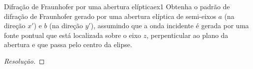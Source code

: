 \begin{exercício}{Difração de Fraunhofer por uma abertura elíptica}{ex1}
    Obtenha o padrão de difração de Fraunhofer gerado por uma abertura elíptica de semi-eixos \(a\) (na direção \(x'\)) e \(b\) (na direção \(y'\)), assumindo que a onda incidente é gerada por uma fonte pontual que está localizada sobre o eixo \(z\), perpenticular ao plano da abertura e que passa pelo centro da elipse.
\end{exercício}
\begin{proof}[Resolução]
    
\end{proof}
